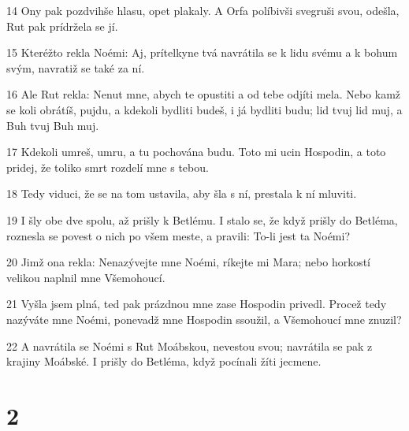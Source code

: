 \par 14 Ony pak pozdvihše hlasu, opet plakaly. A Orfa políbivši svegruši svou, odešla, Rut pak prídržela se jí.
\par 15 Kteréžto rekla Noémi: Aj, prítelkyne tvá navrátila se k lidu svému a k bohum svým, navratiž se také za ní.
\par 16 Ale Rut rekla: Nenut mne, abych te opustiti a od tebe odjíti mela. Nebo kamž se koli obrátíš, pujdu, a kdekoli bydliti budeš, i já bydliti budu; lid tvuj lid muj, a Buh tvuj Buh muj.
\par 17 Kdekoli umreš, umru, a tu pochována budu. Toto mi ucin Hospodin, a toto pridej, že toliko smrt rozdelí mne s tebou.
\par 18 Tedy viduci, že se na tom ustavila, aby šla s ní, prestala k ní mluviti.
\par 19 I šly obe dve spolu, až prišly k Betlému. I stalo se, že když prišly do Betléma, roznesla se povest o nich po všem meste, a pravili: To-li jest ta Noémi?
\par 20 Jimž ona rekla: Nenazývejte mne Noémi, ríkejte mi Mara; nebo horkostí velikou naplnil mne Všemohoucí.
\par 21 Vyšla jsem plná, ted pak prázdnou mne zase Hospodin privedl. Procež tedy nazýváte mne Noémi, ponevadž mne Hospodin ssoužil, a Všemohoucí mne znuzil?
\par 22 A navrátila se Noémi s Rut Moábskou, nevestou svou; navrátila se pak z krajiny Moábské. I prišly do Betléma, když pocínali žíti jecmene.

\chapter{2}


